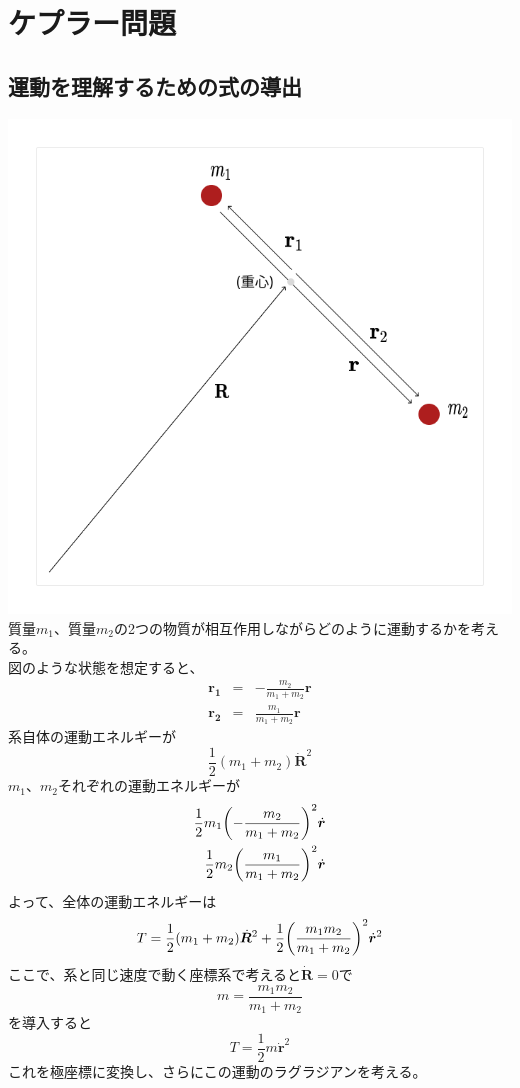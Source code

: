 \documentclass[dvipdfmx]{report} %
\begin{document}
\section{
   ケプラー問題
}

\subsection{
運動を理解するための式の導出
}

\includegraphics[width=.60\columnwidth]{./images/two_body_initial.png}\\
\noindent
質量$m_1$、質量$m_2$の2つの物質が相互作用しながらどのように運動するかを考える。\\
図のような状態を想定すると、
\begin{eqnarray*}
	\bm{r_1} &=& - \frac{m_2}{m_1+m_2} \bm{r}\\
	\bm{r_2} &=& \frac{m_1}{m_1+m_2} \bm{r}
\end{eqnarray*}
系自体の運動エネルギーが
$$ \frac{1}{2} (m_1+m_2) \dot{ \bm{R} }^2 $$
$m_1$、$m_2$それぞれの運動エネルギーが
\begin{eqnarray*}
	\frac{1}{2} m_1 \biggl{(} - \frac{m_2}{m_1+m_2} \biggr{)}^2  \dot{ \bm{r} }\\
	\frac{1}{2} m_2 \biggl{(} \frac{m_1}{m_1+m_2} \biggr{)}^2  \dot{ \bm{r} }
\end{eqnarray*}
よって、全体の運動エネルギーは
$$
T = \frac{1}{2} (m_1+m_2) \dot{ \bm{R} }^2 + \frac{1}{2} \biggl{(} \frac{m_1m_2}{m_1+m_2} \biggr{)}^2 \dot{ \bm{r} }^2
$$
ここで、系と同じ速度で動く座標系で考えると$\dot{ \bm{R} }= 0$で\\
$$m = \frac{m_1m_2}{m_1+m_2}$$
を導入すると
$$T = \frac{1}{2} m \dot{ \bm{r} }^2$$
これを極座標に変換し、さらにこの運動のラグラジアンを考える。\\
\end{document}

